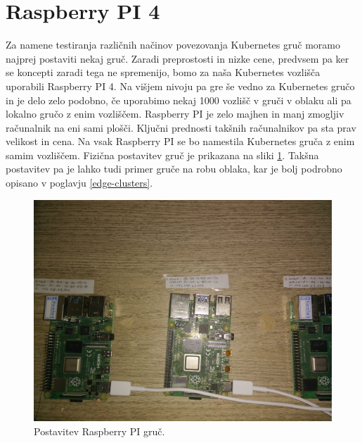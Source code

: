 \documentclass[a4paper, 12pt]{book}
\begin{document}
\section{Raspberry PI 4}
Za namene testiranja različnih načinov povezovanja Kubernetes gruč moramo najprej postaviti nekaj gruč.
Zaradi preprostosti in nizke cene, predvsem pa ker se koncepti zaradi tega ne spremenijo, bomo za naša Kubernetes vozlišča uporabili Raspberry PI 4.
Na višjem nivoju pa gre še vedno za Kubernetes gručo in je delo zelo podobno, če uporabimo nekaj 1000 vozlišč v gruči v oblaku ali pa lokalno gručo z enim vozliščem.
Raspberry PI je zelo majhen in manj zmogljiv računalnik na eni sami plošči.
Ključni prednosti takšnih računalnikov pa sta prav velikost in cena.
Na vsak Raspberry PI se bo namestila Kubernetes gruča z enim samim vozliščem.
Fizična postavitev gruč je prikazana na sliki \ref{rpi-gruce}.
Takšna postavitev pa je lahko tudi primer gruče na robu oblaka, kar je bolj podrobno opisano v poglavju \ref{edge-clusters}.
\begin{figure}[h]
\begin{center}
\includegraphics[width=1.0\textwidth]{images/postavitev-raspberry.jpg}
\end{center}
\caption{Postavitev Raspberry PI gruč.}
\label{rpi-gruce}
\end{figure}
\end{document}
